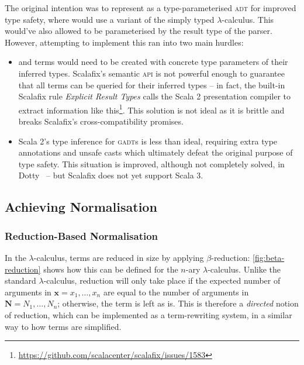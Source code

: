 \documentclass[../../main.tex]{subfiles}
\begin{document}
The original intention was to represent  as a type-parameterised \textsc{adt} for improved type safety, where  would use a variant of the simply typed $\lambda$-calculus.
This would've also allowed  to be parameterised by the result type of the parser.
However, attempting to implement this ran into two main hurdles:
\begin{itemize}
  \item {} and  terms would need to be created with concrete type parameters of their inferred types. Scalafix's semantic \textsc{api} is not powerful enough to guarantee that all terms can be queried for their inferred types -- in fact, the built-in Scalafix rule \emph{Explicit Result Types} calls the Scala 2 presentation compiler to extract information like this\footnote{\url{https://github.com/scalacenter/scalafix/issues/1583}}. This solution is not ideal as it is brittle and breaks Scalafix's cross-compatibility promises.
  \item Scala 2's type inference for \textsc{gadt}s is less than ideal, requiring extra type annotations and unsafe casts which ultimately defeat the original purpose of type safety. This situation is improved, although not completely solved, in Dotty~\cite{parreaux_towards_2019} -- but Scalafix does not yet support Scala 3.
\end{itemize}

\subsection{Achieving Normalisation}\label{sec:normalisation-approach}

\subsubsection{Reduction-Based Normalisation}
In the $\lambda$-calculus, terms are reduced in size by applying $\beta$-reduction: \cref{fig:beta-reduction} shows how this can be defined for the $n$-ary $\lambda$-calculus.
Unlike the standard $\lambda$-calculus, reduction will only take place if the expected number of arguments in $\mathbf{x} = x_1, \ldots, x_n$ are equal to the number of arguments in $\mathbf{N} = N_1, \ldots, N_n$; otherwise, the term is left as is.
This is therefore a \emph{directed} notion of reduction, which can be implemented as a term-rewriting system, in a similar way to how  terms are simplified.
\end{document}
